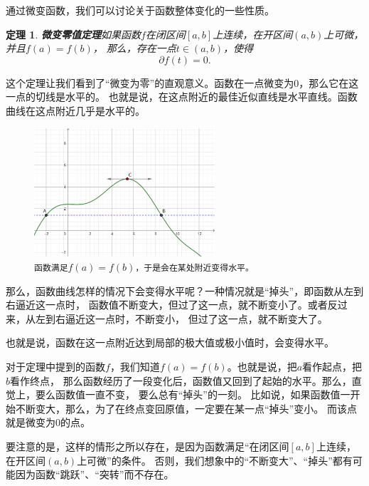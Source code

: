 \documentclass[12pt,UTF8]{ctexbook}
\newtheorem{tm}{定理}[section]
\begin{document}
通过微变函数，我们可以讨论关于函数整体变化的一些性质。

\begin{tm}{\textbf{微变零值定理}}\label{tm:2-4-0}
    如果函数$f$在闭区间$[a, b]$上连续，在开区间$(a, b)$上可微，并且$f(a) = f(b)$，
    那么，存在一点$t\in(a, b)$，使得
    $$ \partial f(t) = 0.$$
\end{tm}

这个定理让我们看到了“微变为零”的直观意义。函数在一点微变为$0$，那么它在这一点的切线是水平的。
也就是说，在这点附近的最佳近似直线是水平直线。函数曲线在这点附近几乎是水平的。

\begin{figure}[h]
    \centering
    \includegraphics[width=0.6\textwidth]{tu/微变零值定理1.png}    
    \caption*{\texttt{函数满足}$f(a) = f(b)$\texttt{，于是会在某处附近变得水平。}}
\end{figure}

那么，函数曲线怎样的情况下会变得水平呢？一种情况就是“掉头”，即函数从左到右逼近这一点时，
函数值不断变大，但过了这一点，就不断变小了。或者反过来，从左到右逼近这一点时，不断变小，
但过了这一点，就不断变大了。

也就是说，函数在这一点附近达到局部的极大值或极小值时，会变得水平。

对于定理中提到的函数$f$，我们知道$f(a) = f(b)$。也就是说，把$a$看作起点，把$b$看作终点，
那么函数经历了一段变化后，函数值又回到了起始的水平。那么，直觉上，要么函数值一直不变，
要么总有“掉头”的一刻。
比如说，如果函数值一开始不断变大，那么，为了在终点变回原值，一定要在某一点“掉头”变小。
而该点就是微变为$0$的点。

要注意的是，这样的情形之所以存在，是因为函数满足“在闭区间$[a, b]$上连续，在开区间$(a, b)$上可微”的条件。
否则，我们想象中的“不断变大”、“掉头”都有可能因为函数“跳跃”、“突转”而不存在。
\end{document}
